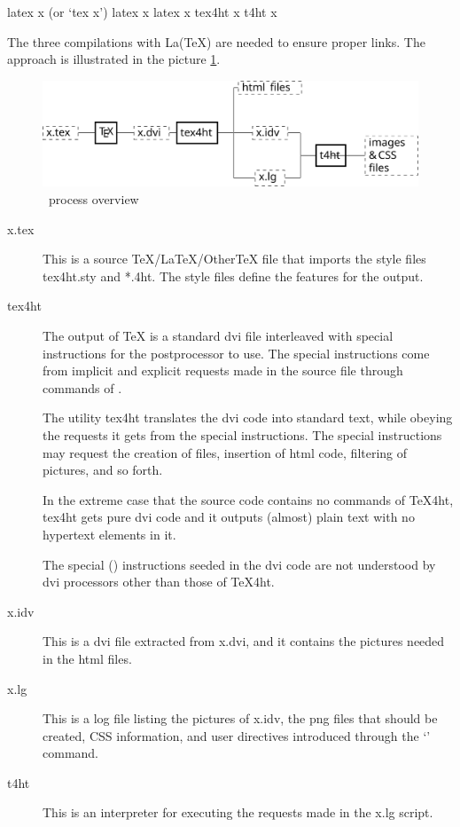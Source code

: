 \begin{shellcommand}
latex      x            (or ‘tex x’) 
latex      x 
latex      x 
tex4ht     x 
t4ht       x 
\end{shellcommand}

The three compilations with La(TeX) are needed to ensure proper links. The approach is illustrated in the picture \ref{fig:process}. 

\begin{figure}
  \includegraphics[width=\textwidth]{images/tex4ht_process/tex4ht_process}
  \caption{\texfourht\ process overview}
  \label{fig:process}
\end{figure}

\begin{description}
  \item[x.tex]

This is a source TeX/LaTeX/OtherTeX file that imports the style files tex4ht.sty and *.4ht. The style files define the features for the output.

\item[tex4ht]

The output of \TeX{} is a standard dvi file interleaved with special
instructions for the postprocessor  to use. The special
instructions come from implicit and explicit requests made in the source file
through commands of \texfourht.

The utility tex4ht translates the dvi code into standard text, while obeying
the requests it gets from the special instructions. The special instructions
may request the creation of files, insertion of html code, filtering of
pictures, and so forth.

In the extreme case that the source code contains no commands of TeX4ht, tex4ht
gets pure dvi code and it outputs (almost) plain text with no hypertext
elements in it.

The special (\texcommand{\special}) instructions seeded in the dvi code are not understood
by dvi processors other than those of TeX4ht.

\item[x.idv]

This is a dvi file extracted from x.dvi, and it contains the pictures needed in
the html files.

\item[x.lg]

This is a log file listing the pictures of x.idv, the png files that should be
created, CSS information, and user directives introduced through the
‘’ command.

\item[t4ht]
This is an interpreter for executing the requests made in the x.lg script.

\end{description}


